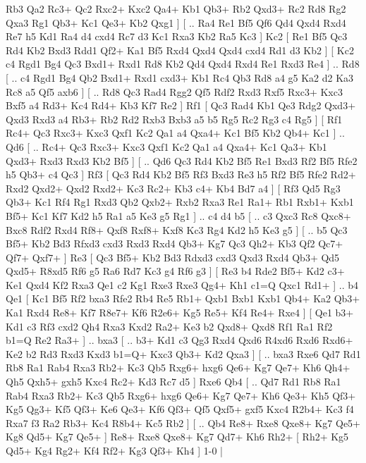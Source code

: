 Rb3  Qa2 Rc3+  Qc2 Rxc2+  Kxc2 Qa4+  Kb1 Qb3+  Rb2 Qxd3+  Rc2 Rd8  Rg2 Qxa3  Rg1 Qb3+  Kc1 Qe3+  Kb2 Qxg1   ]  [ .. Ra4  Re1 Bf5  Qf6 Qd4  Qxd4 Rxd4  Re7 h5  Kd1 Ra4  d4 cxd4  Rc7 d3  Kc1 Rxa3  Kb2 Ra5  Kc3   ]  Kc2 [  Re1 Bf5  Qc3 Rd4  Kb2 Bxd3  Rdd1 Qf2+  Ka1 Bf5  Rxd4 Qxd4  Qxd4 cxd4  Rd1 d3  Kb2   ]  [  Kc2 c4  Rgd1 Bg4  Qc3 Bxd1+  Rxd1 Rd8  Kb2 Qd4  Qxd4 Rxd4  Re1 Rxd3  Re4   ] .. Rd8 [ .. c4  Rgd1 Bg4  Qb2 Bxd1+  Rxd1 cxd3+  Kb1 Rc4  Qb3 Rd8  a4 g5  Ka2 d2  Ka3 Rc8  a5 Qf5  axb6   ]  [ .. Rd8  Qc3 Rad4  Rgg2 Qf5  Rdf2 Rxd3  Rxf5 Rxc3+  Kxc3 Bxf5  a4 Rd3+  Kc4 Rd4+  Kb3 Kf7  Re2   ]  Rf1 [  Qc3 Rad4  Kb1 Qe3  Rdg2 Qxd3+  Qxd3 Rxd3  a4 Rb3+  Rb2 Rd2  Rxb3 Bxb3  a5 b5  Rg5 Rc2  Rg3 c4  Rg5   ]  [  Rf1 Rc4+  Qc3 Rxc3+  Kxc3 Qxf1  Kc2 Qa1  a4 Qxa4+  Kc1 Bf5  Kb2 Qb4+  Kc1   ] .. Qd6 [ .. Rc4+  Qc3 Rxc3+  Kxc3 Qxf1  Kc2 Qa1  a4 Qxa4+  Kc1 Qa3+  Kb1 Qxd3+  Rxd3 Rxd3  Kb2 Bf5   ]  [ .. Qd6  Qc3 Rd4  Kb2 Bf5  Re1 Bxd3  Rf2 Bf5  Rfe2 h5  Qb3+ c4  Qc3   ]  Rf3 [  Qc3 Rd4  Kb2 Bf5  Rf3 Bxd3  Re3 h5  Rf2 Bf5  Rfe2 Rd2+  Rxd2 Qxd2+  Qxd2 Rxd2+  Kc3 Rc2+  Kb3 c4+  Kb4 Bd7  a4   ]  [  Rf3 Qd5  Rg3 Qb3+  Kc1 Rf4  Rg1 Rxd3  Qb2 Qxb2+  Rxb2 Rxa3  Re1 Ra1+  Rb1 Rxb1+  Kxb1 Bf5+  Kc1 Kf7  Kd2 h5  Ra1 a5  Ke3 g5  Rg1   ] .. c4    d4   b5 [ .. c3  Qxc3 Rc8  Qxc8+ Bxc8  Rdf2 Rxd4  Rf8+ Qxf8  Rxf8+ Kxf8  Kc3 Rg4  Kd2 h5  Ke3 g5   ]  [ .. b5  Qc3 Bf5+  Kb2 Bd3  Rfxd3 cxd3  Rxd3 Rxd4  Qb3+ Kg7  Qc3 Qh2+  Kb3 Qf2  Qc7+ Qf7+  Qxf7+   ]  Re3 [  Qc3 Bf5+  Kb2 Bd3  Rdxd3 cxd3  Qxd3 Rxd4  Qb3+ Qd5  Qxd5+ R8xd5  Rf6 g5  Ra6 Rd7  Kc3 g4  Rf6 g3   ]  [  Re3 b4  Rde2 Bf5+  Kd2 c3+  Ke1 Qxd4  Kf2 Rxa3  Qe1 c2  Kg1 Rxe3  Rxe3 Qg4+  Kh1 c1=Q  Qxc1 Rd1+   ] .. b4    Qe1 [  Kc1 Bf5  Rf2 bxa3  Rfe2 Rb4  Re5 Rb1+  Qxb1 Bxb1  Kxb1 Qb4+  Ka2 Qb3+  Ka1 Rxd4  Re8+ Kf7  R8e7+ Kf6  R2e6+ Kg5  Re5+ Kf4  Re4+ Rxe4   ]  [  Qe1 b3+  Kd1 c3  Rf3 cxd2  Qh4 Rxa3  Kxd2 Ra2+  Ke3 b2  Qxd8+ Qxd8  Rf1 Ra1  Rf2 b1=Q  Re2 Ra3+   ] .. bxa3 [ .. b3+  Kd1 c3  Qg3 Rxd4  Qxd6 R4xd6  Rxd6 Rxd6+  Ke2 b2  Rd3 Rxd3  Kxd3 b1=Q+  Kxc3 Qb3+  Kd2 Qxa3   ]  [ .. bxa3  Rxe6 Qd7  Rd1 Rb8  Ra1 Rab4  Rxa3 Rb2+  Kc3 Qb5  Rxg6+ hxg6  Qe6+ Kg7  Qe7+ Kh6  Qh4+ Qh5  Qxh5+ gxh5  Kxc4 Rc2+  Kd3 Rc7  d5   ]  Rxe6   Qb4 [ .. Qd7  Rd1 Rb8  Ra1 Rab4  Rxa3 Rb2+  Kc3 Qb5  Rxg6+ hxg6  Qe6+ Kg7  Qe7+ Kh6  Qe3+ Kh5  Qf3+ Kg5  Qg3+ Kf5  Qf3+ Ke6  Qe3+ Kf6  Qf3+ Qf5  Qxf5+ gxf5  Kxc4 R2b4+  Kc3 f4  Rxa7 f3  Ra2 Rb3+  Kc4 R8b4+  Kc5 Rb2   ]  [ .. Qb4  Re8+ Rxe8  Qxe8+ Kg7  Qe5+ Kg8  Qd5+ Kg7  Qe5+   ]  Re8+   Rxe8    Qxe8+   Kg7    Qd7+   Kh6    Rh2+    [  Rh2+ Kg5  Qd5+ Kg4  Rg2+ Kf4  Rf2+ Kg3  Qf3+ Kh4   ] 1-0  |
